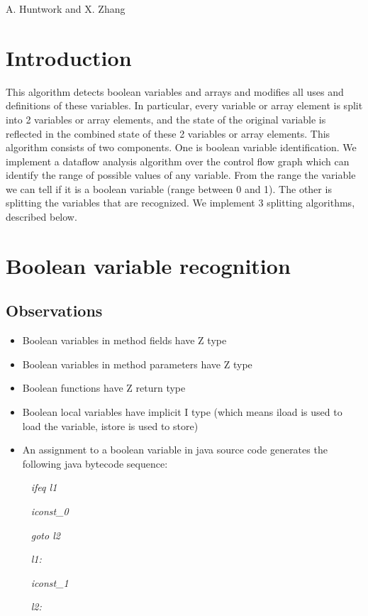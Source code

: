 %
          {A. Huntwork and X. Zhang}


\section{Introduction}
This algorithm detects boolean variables and arrays and modifies 
all uses and definitions of these variables.  In particular, every 
variable or array element is split into 2 variables or array elements,
and the state of the original variable is reflected in the combined 
state of these 2 variables or array elements. 
This algorithm consists of two components. One is 
 boolean variable identification. We implement a dataflow analysis algorithm over the
control flow graph which can identify the range of possible values of any variable.
From the range the variable we can tell if it is a boolean variable
(range between 0 and 1). The other is splitting the variables 
that are recognized. We implement 3 splitting algorithms, described below.

\section{Boolean variable recognition}

\subsection{Observations}

\begin{itemize}
\item Boolean variables in method fields have Z type
\item Boolean variables in method parameters have Z type
\item Boolean functions have Z return type
\item Boolean local variables have implicit I type (which means iload is used
to load the variable, istore is used to store)
\item An assignment to a boolean variable in java source code generates
the following java bytecode sequence:
\end{itemize}
\emph{~~~~~ifeq l1}

\emph{~~~~~iconst\_0}

\emph{~~~~~goto l2}

\emph{~~~~~l1:}

\emph{~~~~~iconst\_1}

\emph{~~~~~l2:}

